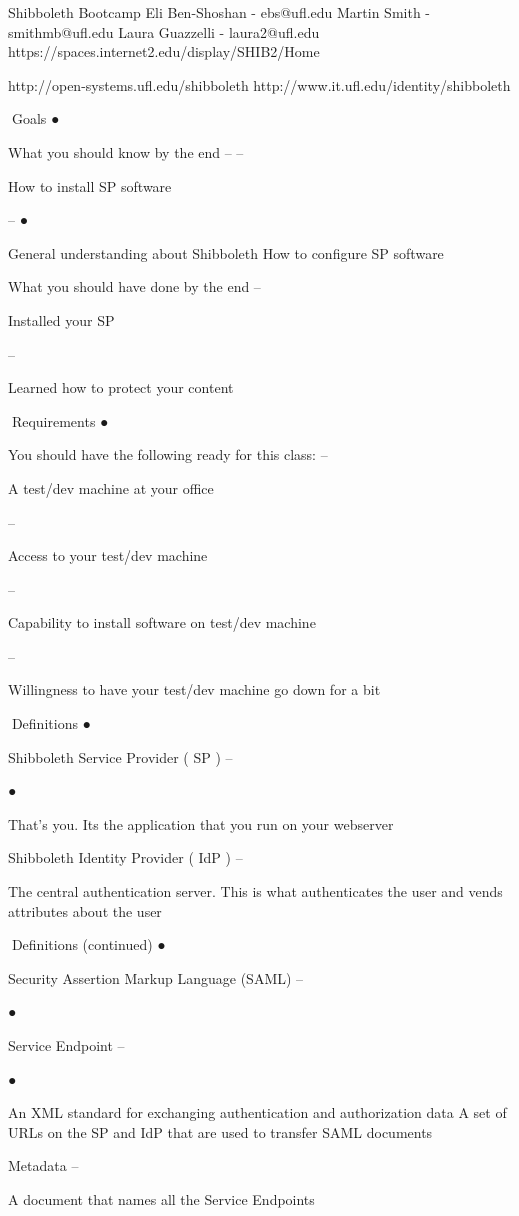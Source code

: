 Shibboleth Bootcamp
Eli Ben-Shoshan - ebs@ufl.edu
Martin Smith - smithmb@ufl.edu
Laura Guazzelli - laura2@ufl.edu
https://spaces.internet2.edu/display/SHIB2/Home

http://open-systems.ufl.edu/shibboleth
http://www.it.ufl.edu/identity/shibboleth

Goals
●

What you should know by the end
–
–

How to install SP software

–
●

General understanding about Shibboleth
How to configure SP software

What you should have done by the end
–

Installed your SP

–

Learned how to protect your content

Requirements
●

You should have the following ready for
this class:
–

A test/dev machine at your office

–

Access to your test/dev machine

–

Capability to install software on test/dev
machine

–

Willingness to have your test/dev machine
go down for a bit

Definitions
●

Shibboleth Service Provider ( SP )
–

●

That's you. Its the application that you run
on your webserver

Shibboleth Identity Provider ( IdP )
–

The central authentication server. This is
what authenticates the user and vends
attributes about the user

Definitions (continued)
●

Security Assertion Markup Language
(SAML)
–

●

Service Endpoint
–

●

An XML standard for exchanging
authentication and authorization data
A set of URLs on the SP and IdP that are
used to transfer SAML documents

Metadata
–

A document that names all the Service
Endpoints

